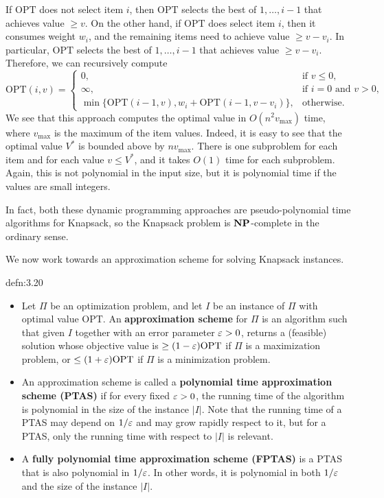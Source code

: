 \begin{itemize}
    If $\text{OPT}$ does not select item $i$, then $\text{OPT}$ selects the 
    best of $1, \dots, i-1$ that achieves value $\geq v$. On the other hand, 
    if $\text{OPT}$ does select item $i$, then it consumes weight $w_i$, 
    and the remaining items need to achieve value $\geq v - v_i$. 
    In particular, $\text{OPT}$ selects the best of $1, \dots, i-1$ that
    achieves value $\geq v - v_i$. Therefore, we can recursively compute 
    \[ \text{OPT}(i, v) = \begin{cases}
        0, & \text{if } v \leq 0, \\ 
        \infty, & \text{if } i = 0 \text{ and } v > 0, \\ 
        \min\{\text{OPT}(i-1, v), w_i + \text{OPT}(i-1, v-v_i)\}, & 
        \text{otherwise.} 
    \end{cases} \] 
    We see that this approach computes the optimal value in $O(n^2 v_{\max})$ 
    time, where $v_{\max}$ is the maximum of the item values. Indeed, 
    it is easy to see that the optimal value $V^*$ is bounded above by 
    $nv_{\max}$. There is one subproblem for each item and for each 
    value $v \leq V^*$, and it takes $O(1)$ time for each subproblem. 
    Again, this is not polynomial in the input size, but it is polynomial time 
    if the values are small integers. 
\end{itemize}

In fact, both these dynamic programming approaches are pseudo-polynomial
time algorithms for {\sc Knapsack}, so the {\sc Knapsack} problem is 
$\operatorname{\textbf{NP}}$-complete in the ordinary sense. 

We now work towards an approximation scheme for solving {\sc Knapsack} instances. 

\begin{defn}{defn:3.20}
    \begin{itemize}
        \item Let $\Pi$ be an optimization problem, and let $I$ be 
        an instance of $\Pi$ with optimal value $\text{OPT}$. 
        An {\bf approximation scheme} for $\Pi$ is an algorithm such that 
        given $I$ together with an error parameter $\varepsilon > 0$, returns a
        (feasible) solution whose objective value is $\geq (1 - \varepsilon) 
        \text{OPT}$ if $\Pi$ is a maximization problem, or $\leq (1 + \varepsilon) 
        \text{OPT}$ if $\Pi$ is a minimization problem.
        \item An approximation scheme is called a {\bf polynomial time 
        approximation scheme (PTAS)} if for every fixed $\varepsilon > 0$, the 
        running time of the algorithm is polynomial in the size of the 
        instance $|I|$. Note that the running time of a PTAS may depend 
        on $1/\varepsilon$ and may grow rapidly respect to it, but for a PTAS, 
        only the running time with respect to $|I|$ is relevant. 
        \item A {\bf fully polynomial time approximation scheme (FPTAS)} 
        is a PTAS that is also polynomial in $1/\varepsilon$. In other words, 
        it is polynomial in both $1/\varepsilon$ and the size of the instance $|I|$. 
    \end{itemize}
\end{defn}

